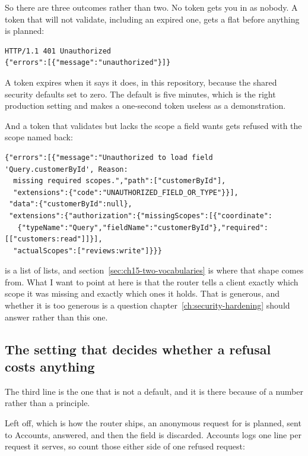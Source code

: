 So there are three outcomes rather than two. No token gets you in as nobody. A
token that will not validate, including an expired one, gets a flat 
before anything is planned:

\begin{verbatim}
HTTP/1.1 401 Unauthorized
{"errors":[{"message":"unauthorized"}]}
\end{verbatim}

%
A token expires when it says it does, in this repository, because the shared
security defaults set  to zero. The default is five minutes,
which is the right production setting and makes a one-second token useless as a
demonstration.

And a token that validates but lacks the scope a field wants gets refused with
the scope named back:

\begin{verbatim}
{"errors":[{"message":"Unauthorized to load field 'Query.customerById', Reason:
  missing required scopes.","path":["customerById"],
  "extensions":{"code":"UNAUTHORIZED_FIELD_OR_TYPE"}}],
 "data":{"customerById":null},
 "extensions":{"authorization":{"missingScopes":[{"coordinate":
   {"typeName":"Query","fieldName":"customerById"},"required":[["customers:read"]]}],
  "actualScopes":["reviews:write"]}}}
\end{verbatim}

 is a list of lists, and section~\ref{sec:ch15-two-vocabularies}
is where that shape comes from. What I want to point at here is that the router
tells a client exactly which scope it was missing and exactly which ones it
holds. That is generous, and whether it is too generous is a question
chapter~\ref{ch:security-hardening} should answer rather than this one.

\subsection*{The setting that decides whether a refusal costs anything}

%
The third line is the one that is not a default, and it is there because of a
number rather than a principle.

Left off, which is how the router ships, an anonymous request for
 is planned, sent to Accounts, answered, and then the
field is discarded. Accounts logs one  line per
request it serves, so count those either side of one refused request:

